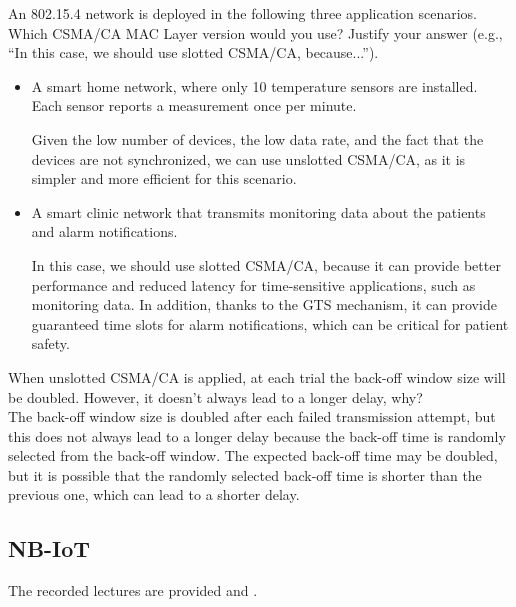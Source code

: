 \begin{ejercicio}
    An 802.15.4 network is deployed in the following three application scenarios. Which CSMA/CA MAC Layer version would you use? Justify your answer (e.g., ``In this case, we should use slotted CSMA/CA, because...'').
    \begin{itemize}
        \item A smart home network, where only 10 temperature sensors are installed. Each sensor reports a measurement once per minute.
        
        Given the low number of devices, the low data rate, and the fact that the devices are not synchronized, we can use unslotted CSMA/CA, as it is simpler and more efficient for this scenario.
        \item A smart clinic network that transmits monitoring data about the patients and alarm notifications.
        
        In this case, we should use slotted CSMA/CA, because it can provide better performance and reduced latency for time-sensitive applications, such as monitoring data. In addition, thanks to the GTS mechanism, it can provide guaranteed time slots for alarm notifications, which can be critical for patient safety.
    \end{itemize}
\end{ejercicio}

\begin{ejercicio}
    When unslotted CSMA/CA is applied, at each trial the back-off window size will be doubled. However, it doesn't always lead to a longer delay, why?\\

    The back-off window size is doubled after each failed transmission attempt, but this does not always lead to a longer delay because the back-off time is randomly selected from the back-off window. The expected back-off time may be doubled, but it is possible that the randomly selected back-off time is shorter than the previous one, which can lead to a shorter delay.
\end{ejercicio}

\newpage\subsection{NB-IoT}

The recorded lectures are provided  and .

